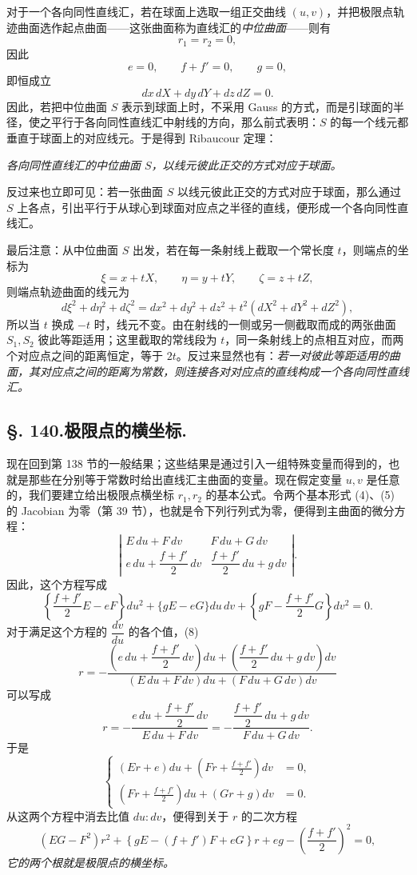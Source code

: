 对于一个各向同性直线汇，若在球面上选取一组正交曲线 \((u,v)\)，并把极限点轨迹曲面选作起点曲面——这张曲面称为直线汇的\emph{中位曲面}——则有
\[
 r_1=r_2=0,
\]
因此
\[
 e=0,
 \qquad f+f'=0,
 \qquad g=0,
\]
即恒成立
\[
 dx\,dX+dy\,dY+dz\,dZ=0.
\]
因此，若把中位曲面 \(S\) 表示到球面上时，不采用 Gauss 的方式，而是引球面的半径，使之平行于各向同性直线汇中射线的方向，那么前式表明：\(S\) 的每一个线元都垂直于球面上的对应线元。于是得到 Ribaucour 定理：

\emph{各向同性直线汇的中位曲面 \(S\)，以线元彼此正交的方式对应于球面。}

反过来也立即可见：若一张曲面 \(S\) 以线元彼此正交的方式对应于球面，那么通过 \(S\) 上各点，引出平行于从球心到球面对应点之半径的直线，便形成一个各向同性直线汇。

最后注意：从中位曲面 \(S\) 出发，若在每一条射线上截取一个常长度 \(t\)，则端点的坐标为
\[
 \xi=x+tX,
 \qquad \eta=y+tY,
 \qquad \zeta=z+tZ,
\]
则端点轨迹曲面的线元为
\[
 d\xi^2+d\eta^2+d\zeta^2=dx^2+dy^2+dz^2+t^2(dX^2+dY^2+dZ^2),
\]
所以当 \(t\) 换成 \(-t\) 时，线元不变。由在射线的一侧或另一侧截取而成的两张曲面 \(S_1,S_2\) 彼此等距适用；这里截取的常线段为 \(t\)，同一条射线上的点相互对应，而两个对应点之间的距离恒定，等于 \(2t\)。反过来显然也有：\emph{若一对彼此等距适用的曲面，其对应点之间的距离为常数，则连接各对对应点的直线构成一个各向同性直线汇。}

\subsection*{\S. 140.\quad 极限点的横坐标.}

现在回到第 138 节的一般结果；这些结果是通过引入一组特殊变量而得到的，也就是那些在分别等于常数时给出直线汇主曲面的变量。现在假定变量 \(u,v\) 是任意的，我们要建立给出极限点横坐标 \(r_1,r_2\) 的基本公式。令两个基本形式 (4)、(5) 的 Jacobian 为零（第 39 节），也就是令下列行列式为零，便得到主曲面的微分方程：
\[
\left|
\begin{matrix}
E\,du+F\,dv & F\,du+G\,dv\\[0.4em]
e\,du+\dfrac{f+f'}2\,dv & \dfrac{f+f'}2\,du+g\,dv
\end{matrix}
\right|.
\]
因此，这个方程写成
\begin{equation}\tag{A}
\left\{\frac{f+f'}2E-eF\right\}du^2+\{gE-eG\}du\,dv+
\left\{gF-\frac{f+f'}2G\right\}dv^2=0.
\end{equation}
对于满足这个方程的 \(\dfrac{dv}{du}\) 的各个值，(8)
\[
 r=-\frac{\left(e\,du+\dfrac{f+f'}2\,dv\right)du+
\left(\dfrac{f+f'}2\,du+g\,dv\right)dv}{(E\,du+F\,dv)du+(F\,du+G\,dv)dv}
\]
可以写成
\[
 r=-\frac{e\,du+\dfrac{f+f'}2\,dv}{E\,du+F\,dv}
  =-\frac{\dfrac{f+f'}2\,du+g\,dv}{F\,du+G\,dv}.
\]
于是
\[
\left\{
\begin{aligned}
(Er+e)du+\left(Fr+\frac{f+f'}2\right)dv&=0,\\
\left(Fr+\frac{f+f'}2\right)du+(Gr+g)dv&=0.
\end{aligned}
\right.
\]
从这两个方程中消去比值 \(du:dv\)，便得到关于 \(r\) 的二次方程
\begin{equation}\tag{B}
 (EG-F^2)r^2+\left\{gE-(f+f')F+eG\right\}r+eg-\left(\frac{f+f'}2\right)^2=0,
\end{equation}
\emph{它的两个根就是极限点的横坐标。}

